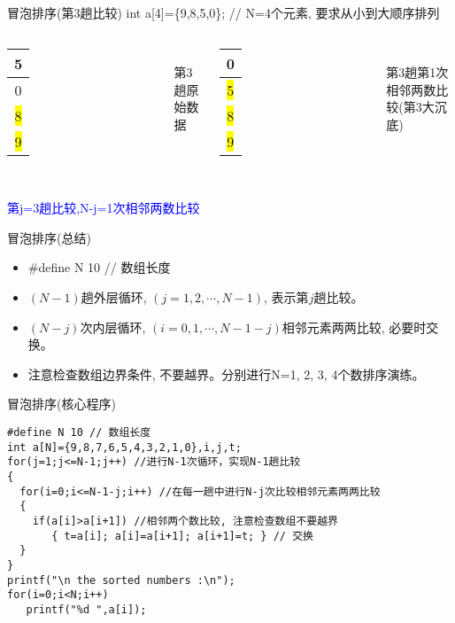 \begin{frame}{冒泡排序(第3趟比较)}
int a[4]=\{9,8,5,0\}; // N=4个元素, 要求从小到大顺序排列
\begin{columns}[T]
	\begin{tabular}{|c|}
		\hline 
		5 \\ 
		\hline 
		0 \\ 
		\hline 
		\colorbox{yellow}{8} \\ 
		\hline
		\colorbox{yellow}{9} \\
		\hline 
	\end{tabular}\\ 
	第3趟原始数据
	\pause
	\begin{tabular}{|c|}
		\hline 
		0 \\ 
		\hline 
		\colorbox{yellow}{5} \\ 
		\hline 
		\colorbox{yellow}{8} \\ 
		\hline
		\colorbox{yellow}{9} \\
		\hline  
	\end{tabular}\\ 
	第3趟第1次相邻两数比较(第3大沉底)
\end{columns}
~\\
\textcolor{blue}{第j=3趟比较,N-j=1次相邻两数比较}
\end{frame}

\begin{frame}{冒泡排序(总结)}
\begin{itemize}
	\setlength{\itemsep}{.5cm}
	\item \#define N 10 // 数组长度
	\item $(N-1)$趟外层循环, $(j=1,2,\cdots,N-1)$, 表示第$j$趟比较。
	\item $(N-j)$次内层循环, $(i=0,1,\cdots, N-1-j)$相邻元素两两比较, 必要时交换。
	\item 注意检查数组边界条件, 不要越界。分别进行N=1, 2, 3, 4个数排序演练。
\end{itemize}
\end{frame}

\begin{frame}{冒泡排序(核心程序)}
\begin{lstlisting}
#define N 10 // 数组长度
int a[N]={9,8,7,6,5,4,3,2,1,0},i,j,t;
for(j=1;j<=N-1;j++) //进行N-1次循环，实现N-1趟比较
{
  for(i=0;i<=N-1-j;i++) //在每一趟中进行N-j次比较相邻元素两两比较
  {
    if(a[i]>a[i+1]) //相邻两个数比较, 注意检查数组不要越界 
       { t=a[i]; a[i]=a[i+1]; a[i+1]=t; } // 交换
  }
}
printf("\n the sorted numbers :\n");
for(i=0;i<N;i++)
   printf("%d ",a[i]);
\end{lstlisting}
\end{frame}

